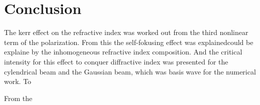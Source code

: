 \chapter{Conclusion}
\label{cha:conclusion}


The kerr effect on the refractive index was worked out from the third nonlinear term of the polarization.
From this the self-fokusing effect was explainedcould be explaine by the inhomogeneous refractive index composition.
And the critical intensity for this effect to conquer diffractive index was presented for the cylendrical beam and the Gaussian beam, which was basis wave for the numerical work. 
To 


From the 


